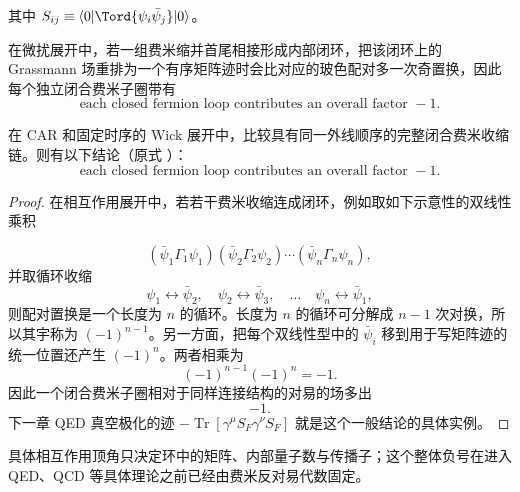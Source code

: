 其中 $S_{ij}\equiv\langle0|\Tord\{\psi_i\bar\psi_j\}|0\rangle$。

在微扰展开中，若一组费米缩并首尾相接形成内部闭环，把该闭环上的 Grassmann 场重排为一个有序矩阵迹时会比对应的玻色配对多一次奇置换，因此每个独立闭合费米子圈带有
\begin{equation}
 \boxed{\text{each closed fermion loop contributes an overall factor }-1.}
 \label{eq:generic-closed-fermion-loop-r68}
\end{equation}

\begin{proposition}[闭费米收缩环的符号]
在 CAR 和固定时序的 Wick 展开中，比较具有同一外线顺序的完整闭合费米收缩链。则有以下结论（原式 ）：
\begin{equation*}
 \boxed{\text{each closed fermion loop contributes an overall factor }-1.}
\end{equation*}
\end{proposition}
\begin{proof}
在相互作用展开中，若若干费米收缩连成闭环，例如取如下示意性的双线性乘积

\begin{equation*}
 (\bar\psi_1\Gamma_1\psi_1)
 (\bar\psi_2\Gamma_2\psi_2)\cdots
 (\bar\psi_n\Gamma_n\psi_n),
\end{equation*}
并取循环收缩
\begin{equation*}
 \psi_1\leftrightarrow\bar\psi_2,
 \quad
 \psi_2\leftrightarrow\bar\psi_3,
 \quad\ldots\quad
 \psi_n\leftrightarrow\bar\psi_1,
\end{equation*}
则配对置换是一个长度为 $n$ 的循环。长度为 $n$ 的循环可分解成 $n-1$ 次对换，所以其宇称为 $(-1)^{n-1}$。另一方面，把每个双线性型中的 $\bar\psi_i$ 移到用于写矩阵迹的统一位置还产生 $(-1)^n$。两者相乘为
\begin{equation*}
 (-1)^{n-1}(-1)^n=-1.
\end{equation*}
因此一个闭合费米子圈相对于同样连接结构的对易的场多出
\begin{equation*}
 {-1.}
 \end{equation*}
下一章 QED 真空极化的迹
$-\operatorname{Tr}[\gamma^\mu S_F\gamma^\nu S_F]$
就是这个一般结论的具体实例。
\end{proof}

具体相互作用顶角只决定环中的矩阵、内部量子数与传播子；这个整体负号在进入 QED、QCD 等具体理论之前已经由费米反对易代数固定。
